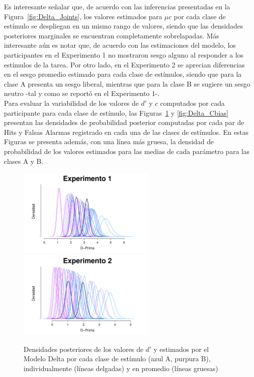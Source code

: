 Es interesante señalar que, de acuerdo con las inferencias presentadas en la Figura~\ref{fig:Delta_Joints}, los valores estimados para $\mu c$ por cada clase de estímulo se despliegan en un mismo rango de valores, siendo que las densidades posteriores marginales se encuentran completamente sobrelapadas. Más interesante aún es notar que, de acuerdo con las estimaciones del modelo, los participantes en el Experimento 1 no mostraron sesgo alguno al responder a los estímulos de la tarea. Por otro lado, en el Experimento 2 se aprecian diferencias en el sesgo promedio estimado para cada clase de estímulos, siendo que para la clase A presenta un sesgo liberal, mientras que para la clase B se sugiere un sesgo neutro -tal y como se reportó en el Experimento 1-.\\

Para evaluar la variabilidad de los valores de $d'$ y $c$ computados por cada participante para cada clase de estímulo, las Figuras~\ref{fig:Delta_Dprima} y \ref{fig:Delta_Cbias} presentan las densidades de probabilidad posterior computadas por cada par de Hits y Falsas Alarmas registrado en cada una de las clases de estímulos. En estas Figuras se presenta además, con una línea más gruesa, la densidad de probabilidad de los valores estimados para las medias de cada parámetro para las clases A y B.\\

\begin{figure}[th]
\centering
\includegraphics[width=0.6\textwidth]{Figures/MDelta_Dprima_E1}\\
\includegraphics[width=0.6\textwidth]{Figures/MDelta_Dprima_E2}\\
\caption[Modelo Delta: Densidades posteriores de los valores de $d'$ estimados individualmente y en promedio, por experimento]{Densidades posteriores de los valores de $d'$ y estimados por el Modelo Delta por cada clase de estímulo (azul A, purpura B), individualmente (líneas delgadas) y en promedio (líneas gruesas)}
\label{fig:Delta_Dprima}
\end{figure}

